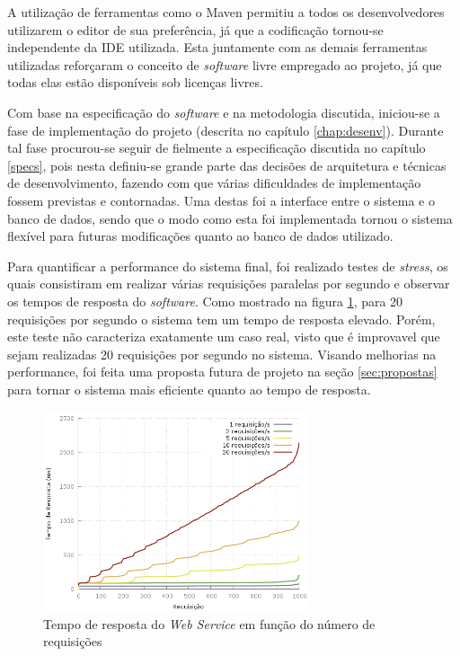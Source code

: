 A utilização de ferramentas como o Maven permitiu a todos os desenvolvedores utilizarem o editor de sua preferência, já que a codificação tornou-se independente da IDE utilizada.
Esta juntamente com as demais ferramentas utilizadas reforçaram o conceito de \emph{software} livre empregado ao projeto, já que todas elas estão disponíveis sob licenças livres. 

Com base na especificação do \emph{software} e na metodologia discutida, iniciou-se a fase de implementação do projeto (descrita no capítulo \ref{chap:desenv}).
Durante tal fase procurou-se seguir de fielmente a especificação discutida no capítulo \ref{specs}, pois nesta definiu-se grande parte das decisões de arquitetura e técnicas de desenvolvimento, fazendo com que várias dificuldades de implementação fossem previstas e contornadas.
Uma destas foi a interface entre o sistema e o banco de dados, sendo que o modo como esta foi implementada tornou o sistema flexível para futuras modificações quanto ao banco de dados utilizado.

Para quantificar a performance do sistema final, foi realizado testes de \emph{stress}, os quais consistiram em realizar várias requisições paralelas por segundo e observar os tempos de resposta do \emph{software}.
Como mostrado na figura \ref{fig:resposta}, para 20 requisições por segundo o sistema tem um tempo de resposta elevado.
Porém, este teste não caracteriza exatamente um caso real, visto que é improvavel que sejam realizadas 20 requisições por segundo no sistema.
Visando melhorias na performance, foi feita uma proposta futura de projeto na seção \ref{sec:propostas} para tornar o sistema mais eficiente quanto ao tempo de resposta.

\begin{figure}[!htb]
	\centering
	\includegraphics[width=0.7\textwidth]{./plots/stresstests/out.png}
	\caption[Tempo de resposta do \emph{Web Service}]{Tempo de resposta do \emph{Web Service} em função do número de requisições}
	\label{fig:resposta}
\end{figure}

